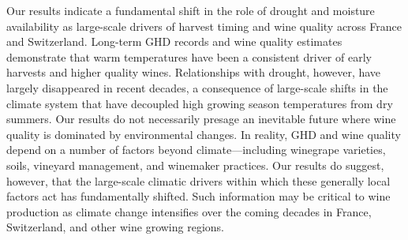 \documentclass[final]{nature}
\begin{document}
\indent Our results indicate a fundamental shift in the role of drought and moisture availability as large-scale drivers of harvest timing and wine quality across France and Switzerland. Long-term GHD records and wine quality estimates demonstrate that warm temperatures have been a consistent driver of early harvests and higher quality wines. Relationships with drought, however, have largely disappeared in recent decades, a consequence of large-scale shifts in the climate system that have decoupled high growing season temperatures from dry summers. Our results do not necessarily presage an inevitable future where wine quality is dominated by environmental changes. In reality, GHD and wine quality depend on a number of factors beyond climate---including winegrape varieties, soils, vineyard management, and winemaker practices\cite{Jackson1993,Leeuwen2013}. Our results do suggest, however, that the large-scale climatic drivers within which these generally local factors act has fundamentally shifted. Such information may be critical to wine production as climate change intensifies over the coming decades in France, Switzerland, and other wine growing regions.

\end{document}
